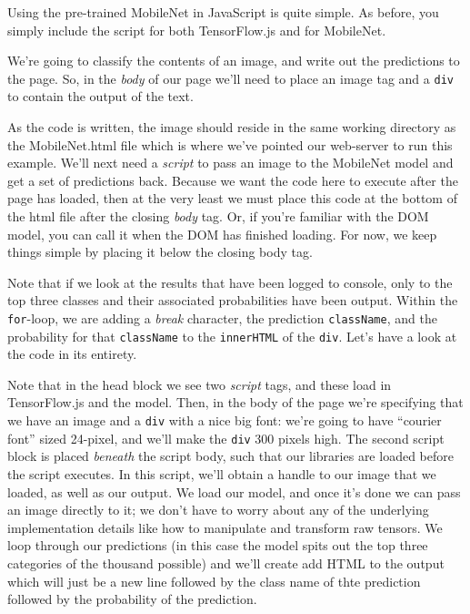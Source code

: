 \documentclass[12pt]{article}
\begin{document}
Using the pre-trained MobileNet in JavaScript is quite simple. As before, you simply include the script for both TensorFlow.js and for MobileNet.

We're going to classify the contents of an image, and write out the predictions to the page. So, in the \emph{body} of our page we'll need to place an image tag and a \texttt{div} to contain the output of the text.

As the code is written, the image should reside in the same working directory as the MobileNet.html file which is where we've pointed our web-server to run this example. We'll next need a \emph{script} to pass an image to the MobileNet model and get a set of predictions back. Because we want the code here to execute after the page has loaded, then at the very least we must place this code at the bottom of the html file after the closing \emph{body} tag. Or, if you're familiar with the DOM model, you can call it when the DOM has finished loading. For now, we keep things simple by placing it below the closing body tag.

Note that if we look at the results that have been logged to console, only to the top three classes and their associated probabilities have been output. Within the \texttt{for}-loop, we are adding a \emph{break} character, the prediction \texttt{className}, and the probability for that \texttt{className} to the \texttt{innerHTML} of the \texttt{div}. Let's have a look at the code in its entirety.

Note that in the head block we see two \emph{script} tags, and these load in TensorFlow.js and the model. Then, in the body of the page we're specifying that we have an image and a \texttt{div} with a nice big font: we're going to have ``courier font'' sized 24-pixel, and we'll make the \texttt{div} 300 pixels high. The second script block is placed \emph{beneath} the script body, such that our libraries are loaded before the script executes. In this script, we'll obtain a handle to our image that we loaded, as well as our output. We load our model, and once it's done we can pass an image directly to it; we don't have to worry about any of the underlying implementation details like how to manipulate and transform raw tensors. We loop through our predictions (in this case the model spits out the top three categories of the thousand possible) and we'll create add HTML to the output which will just be a new line followed by the class name of thte prediction followed by the probability of the prediction.
\end{document}
